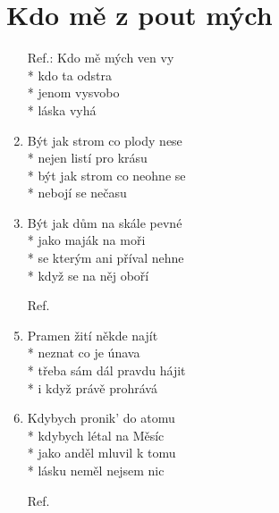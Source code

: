 \section{Kdo mě z pout mých}
\begin{enumerate}
\item[Ref.:] Kdo mě  mých ven vy \\*
kdo ta  odstra  \\*
jenom  vysvobo \\*
láska  vyhá 
\item Být jak strom co plody nese \\*
nejen listí pro krásu \\*
být jak strom co neohne se \\*
nebojí se nečasu 
\item Být jak dům na skále pevné \\*
jako maják na moři \\*
se kterým ani příval nehne \\*
když se na něj oboří 
\item[Ref.] 
\item Pramen žití někde najít \\*
neznat co je únava \\*
třeba sám dál pravdu hájit \\*
i když právě prohrává 
\item Kdybych pronik' do atomu \\*
kdybych létal na Měsíc \\*
jako anděl mluvil k tomu \\*
lásku neměl nejsem nic 
\item[Ref.]
\end{enumerate}
